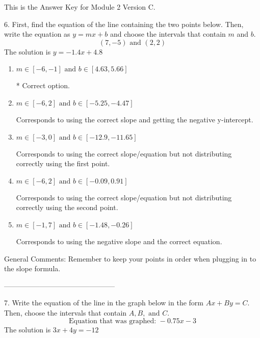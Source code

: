 \documentclass{article}[10pt]
\begin{document}
This is the Answer Key for Module 2 Version C.

6. First, find the equation of the line containing the two points below. Then, write the equation as $ y=mx+b $ and choose the intervals that contain $m$ and $b$.
$$ (7, -5) \text{ and } (2, 2) $$ 
The solution is $ y = -1.4 x + 4.8 $ 

\begin{enumerate}[label=\Alph*.] 
\item $ m \in [-6, -1] \text{ and } b \in [4.63, 5.66] $ 

 * Correct option. 
\item $ m \in [-6, 2] \text{ and } b \in [-5.25, -4.47] $ 

  Corresponds to using the correct slope and getting the negative y-intercept. 
\item $ m \in [-3, 0] \text{ and } b \in [-12.9, -11.65] $ 

  Corresponds to using the correct slope/equation but not distributing correctly using the first point. 
\item $ m \in [-6, 2] \text{ and } b \in [-0.09, 0.91] $ 

  Corresponds to using the correct slope/equation but not distributing correctly using the second point. 
\item $ m \in [-1, 7] \text{ and } b \in [-1.48, -0.26] $ 

  Corresponds to using the negative slope and the correct equation. 
\end{enumerate} 
 
General Comments: Remember to keep your points in order when plugging in to the slope formula.

-----------------------------------------------

7. Write the equation of the line in the graph below in the form $Ax+By=C$. Then, choose the intervals that contain $A, B, \text{ and } C$.
$$ \text{Equation that was graphed: } -0.75 x - 3 $$ 
The solution is $ 3 x + 4 y = -12 $ 
\end{document}

